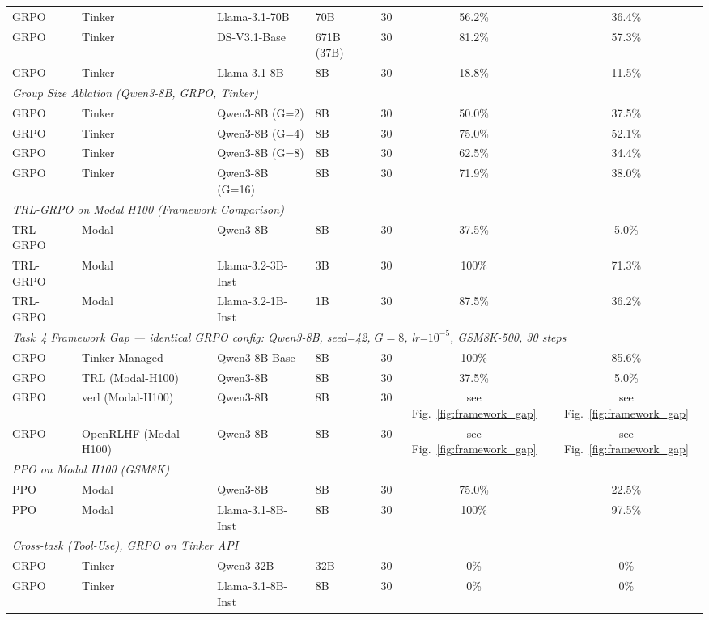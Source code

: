 \documentclass{article}
\begin{document}
\begin{table}[t]
\begin{tabular}{@{}l l l l r c c@{}}
GRPO & Tinker & Llama-3.1-70B & 70B & 30 & 56.2\% & 36.4\% \\
GRPO & Tinker & DS-V3.1-Base & 671B (37B) & 30 & 81.2\% & 57.3\% \\
GRPO & Tinker & Llama-3.1-8B & 8B & 30 & 18.8\% & 11.5\% \\
\midrule
\multicolumn{7}{l}{\textit{Group Size Ablation (Qwen3-8B, GRPO, Tinker)}} \\
\midrule
GRPO & Tinker & Qwen3-8B (G=2) & 8B & 30 & 50.0\% & 37.5\% \\
GRPO & Tinker & Qwen3-8B (G=4) & 8B & 30 & 75.0\% & 52.1\% \\
GRPO & Tinker & Qwen3-8B (G=8) & 8B & 30 & 62.5\% & 34.4\% \\
GRPO & Tinker & Qwen3-8B (G=16) & 8B & 30 & 71.9\% & 38.0\% \\
\midrule
\multicolumn{7}{l}{\textit{TRL-GRPO on Modal H100 (Framework Comparison)}} \\
\midrule
TRL-GRPO & Modal & Qwen3-8B & 8B & 30 & 37.5\% & 5.0\% \\
TRL-GRPO & Modal & Llama-3.2-3B-Inst & 3B & 30 & 100\% & 71.3\% \\
TRL-GRPO & Modal & Llama-3.2-1B-Inst & 1B & 30 & 87.5\% & 36.2\% \\
\midrule
\multicolumn{7}{l}{\textit{Task~4 Framework Gap --- identical GRPO config: Qwen3-8B, seed=42, $G=8$, lr=$10^{-5}$, GSM8K-500, 30 steps}} \\
\midrule
GRPO & Tinker-Managed & Qwen3-8B-Base & 8B & 30 & 100\% & 85.6\% \\
GRPO & TRL (Modal-H100) & Qwen3-8B & 8B & 30 & 37.5\% & 5.0\% \\
GRPO & verl (Modal-H100) & Qwen3-8B & 8B & 30 & see Fig.~\ref{fig:framework_gap} & see Fig.~\ref{fig:framework_gap} \\
GRPO & OpenRLHF (Modal-H100) & Qwen3-8B & 8B & 30 & see Fig.~\ref{fig:framework_gap} & see Fig.~\ref{fig:framework_gap} \\
\midrule
\multicolumn{7}{l}{\textit{PPO on Modal H100 (GSM8K)}} \\
\midrule
PPO & Modal & Qwen3-8B & 8B & 30 & 75.0\% & 22.5\% \\
PPO & Modal & Llama-3.1-8B-Inst & 8B & 30 & 100\% & 97.5\% \\
\midrule
\multicolumn{7}{l}{\textit{Cross-task (Tool-Use), GRPO on Tinker API}} \\
\midrule
GRPO & Tinker & Qwen3-32B & 32B & 30 & 0\% & 0\% \\
GRPO & Tinker & Llama-3.1-8B-Inst & 8B & 30 & 0\% & 0\% \\
\bottomrule
\end{tabular}
\end{table}
\end{document}
